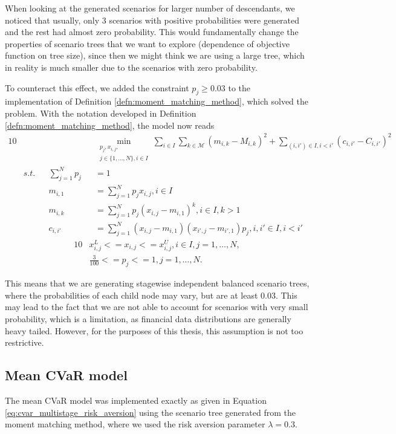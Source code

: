 When looking at the generated scenarios for larger number of descendants, we noticed that usually, only 3 scenarios with positive probabilities were generated and the rest had almost zero probability. This would fundamentally change the properties of scenario trees that we want to explore (dependence of objective function on tree size), since then we might think we are using a large tree, which in reality is much smaller due to the scenarios with zero probability. 

To counteract this effect, we added the constraint $p_j \geq 0.03$ to the implementation of Definition \ref{defn:moment_matching_method}, which solved the problem. With the notation developed in Definition \ref{defn:moment_matching_method}, the model now reads
\begin{alignat}{10}
& && && \underset{\substack{p_j, x_{i,j}, \\ j \in \{1,...,N\}, i \in I}}{\min} \sum_{i\in I} \sum_{k\in \mathcal{M}} \left(m_{i,k} - M_{i,k}\right)^2 + \sum_{(i, i') \in I, i < i'}(c_{i,i'}-C_{i,i'})^2 \nonumber \\
& s.t. && \sum_{j=1}^N p_j&&=1 \nonumber \\
& && m_{i,1}&&=\sum_{j=1}^N p_jx_{i,j}, i \in I \nonumber \\
& && m_{i,k}&&=\sum_{j=1}^N p_j(x_{i,j}-m_{i,1})^k, i \in I, k>1 \nonumber \\
& && c_{i,i'}&&=\sum_{j=1}^N(x_{i,j}-m_{i,1})(x_{i',j}-m_{i',1})p_j, i,i' \in I, i<i' \nonumber
\end{alignat}
\vspace{-0.5cm}
\begin{alignat}{10}
& x_{i,j}^L<=x_{i,j}<=x_{i,j}^U, i \in I, j=1,\dots,N, \nonumber \\
& \frac{3}{100} <= p_j <= 1, j=1,\dots,N. \nonumber
\end{alignat}

This means that we are generating stagewise independent balanced scenario trees, where the probabilities of each child node may vary, but are at least 0.03. This may lead to the fact that we are not able to account for scenarios with very small probability, which is a limitation, as financial data distributions are generally heavy tailed. However, for the purposes of this thesis, this assumption is not too restrictive.


\subsection{Mean CVaR model}
The mean CVaR model was implemented exactly as given in Equation \ref{eq:cvar_multistage_risk_aversion} using the scenario tree generated from the moment matching method, where we used the risk aversion parameter $\lambda=0.3.$ 


